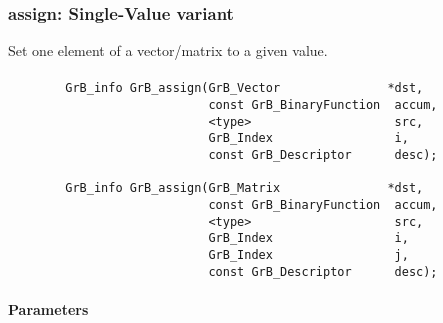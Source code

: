 \subsubsection{{\sf assign}: Single-Value variant}

Set one element of a vector/matrix to a given value.

\paragraph{\syntax}

\begin{verbatim}
        GrB_info GrB_assign(GrB_Vector               *dst,
                            const GrB_BinaryFunction  accum,
                            <type>                    src,
                            GrB_Index                 i,
                            const GrB_Descriptor      desc); 

        GrB_info GrB_assign(GrB_Matrix               *dst,
                            const GrB_BinaryFunction  accum,
                            <type>                    src,
                            GrB_Index                 i,
                            GrB_Index                 j,
                            const GrB_Descriptor      desc); 
\end{verbatim}

\paragraph{Parameters}

